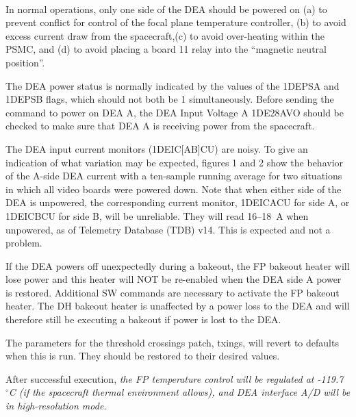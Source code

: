 \documentclass[11pt]{article}
\begin{document}
\normalsize
{} \\
\normalsize

In normal operations, only one side of the DEA should be powered on
(a) to prevent conflict for control of the focal plane temperature controller,
(b) to avoid excess current draw from the spacecraft,(c) to avoid over-heating
within the PSMC, and (d) to avoid placing a board 11 relay into the 
``magnetic neutral position''.

The DEA power status is normally indicated by the values of the 1DEPSA and
1DEPSB flags, which should not both be 1 simultaneously. Before sending the 
command to power on DEA A, the DEA Input Voltage A 1DE28AVO should 
be checked to make sure that DEA A is receiving power from the spacecraft.

The DEA input current monitors (1DEIC[AB]CU) are noisy.
To give an indication of what variation may be expected, figures 1 and 2
show the behavior of the A-side DEA current with a ten-sample running
average for two situations in which all video boards were powered down. Note that
when either side of the DEA is unpowered, the corresponding current monitor, 
1DEICACU for side A, or 1DEICBCU for side B, will be unreliable. They will read
16--18~A when unpowered, as of Telemetry Database (TDB) v14. This is expected and
not a problem.

If the DEA powers off unexpectedly during a bakeout, the FP bakeout 
heater will lose power and this heater will NOT be re-enabled when the DEA side A 
power is restored. Additional SW commands are necessary to activate the FP bakeout 
heater. The DH bakeout heater is unaffected by a power loss to the DEA and will 
therefore still be executing a bakeout if power is lost to the DEA.

The parameters for the threshold crossings patch, txings, will revert to defaults 
when this is run. They should be restored to their desired values.

After successful execution, {\em the FP temperature control will be regulated at 
-119.7~$^\circ$C (if the spacecraft thermal environment allows), and DEA interface 
A/D will be in high-resolution mode.}\\

\vspace{0.15in}
\normalsize
{} \\
\normalsize

\normalsize
{} \\
\normalsize
\end{document}
